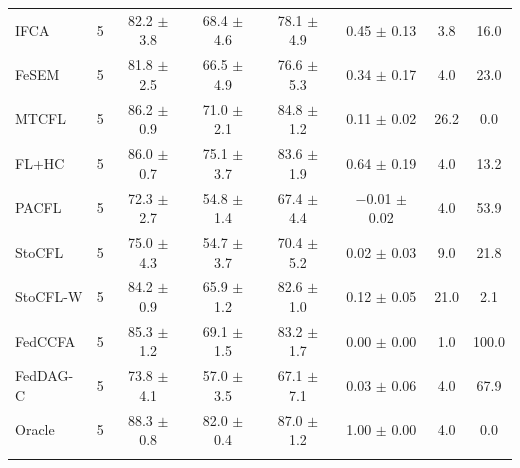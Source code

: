 {\begin{tabular}{l r c c c c c c}
IFCA & 5 & 82.2 $\pm$ 3.8 & 68.4 $\pm$ 4.6 & 78.1 $\pm$ 4.9 & 0.45 $\pm$ 0.13 & 3.8 & 16.0 \\
FeSEM & 5 & 81.8 $\pm$ 2.5 & 66.5 $\pm$ 4.9 & 76.6 $\pm$ 5.3 & 0.34 $\pm$ 0.17 & 4.0 & 23.0 \\
MTCFL & 5 & 86.2 $\pm$ 0.9 & 71.0 $\pm$ 2.1 & 84.8 $\pm$ 1.2 & 0.11 $\pm$ 0.02 & 26.2 & 0.0 \\
FL+HC & 5 & 86.0 $\pm$ 0.7 & 75.1 $\pm$ 3.7 & 83.6 $\pm$ 1.9 & 0.64 $\pm$ 0.19 & 4.0 & 13.2 \\
PACFL & 5 & 72.3 $\pm$ 2.7 & 54.8 $\pm$ 1.4 & 67.4 $\pm$ 4.4 & $-$0.01 $\pm$ 0.02 & 4.0 & 53.9 \\
StoCFL & 5 & 75.0 $\pm$ 4.3 & 54.7 $\pm$ 3.7 & 70.4 $\pm$ 5.2 & 0.02 $\pm$ 0.03 & 9.0 & 21.8 \\
StoCFL-W & 5 & 84.2 $\pm$ 0.9 & 65.9 $\pm$ 1.2 & 82.6 $\pm$ 1.0 & 0.12 $\pm$ 0.05 & 21.0 & 2.1 \\
FedCCFA & 5 & 85.3 $\pm$ 1.2 & 69.1 $\pm$ 1.5 & 83.2 $\pm$ 1.7 & 0.00 $\pm$ 0.00 & 1.0 & 100.0 \\
FedDAG-C & 5 & 73.8 $\pm$ 4.1 & 57.0 $\pm$ 3.5 & 67.1 $\pm$ 7.1 & 0.03 $\pm$ 0.06 & 4.0 & 67.9 \\
Oracle & 5 & 88.3 $\pm$ 0.8 & 82.0 $\pm$ 0.4 & 87.0 $\pm$ 1.2 & 1.00 $\pm$ 0.00 & 4.0 & 0.0 \\
\addlinespace
\bottomrule
\end{tabular}
}

